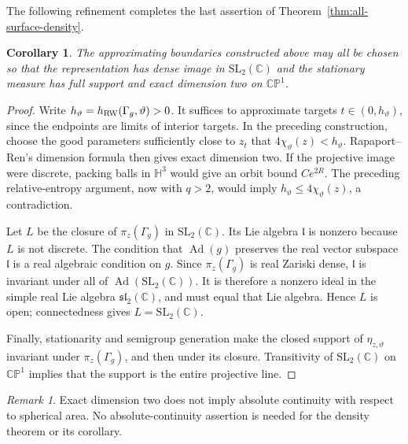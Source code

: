 \documentclass[11pt,letterpaper]{amsart}
\newtheorem{corollary}[theorem]{Corollary}
\theoremstyle{definition}
\theoremstyle{remark}
\newtheorem{remark}[theorem]{Remark}
\numberwithin{equation}{section}
\begin{document}
The following refinement completes the last assertion of
Theorem~\ref{thm:all-surface-density}.

\begin{corollary}\label{cor:dense-image-full-dimension}
The approximating boundaries constructed above
may all be chosen so that the representation has dense image in
$\mathrm{SL}_2(\mathbb C)$ and the stationary measure has full support
and exact dimension two on $\mathbb{CP}^1$.
\end{corollary}

\begin{proof}
Write $h_\vartheta=h_{\rm RW}(\Gamma_g,\vartheta)>0$.
It suffices to approximate targets $t\in(0,h_\vartheta)$, since the
endpoints are limits of interior targets. In the preceding construction,
choose the good parameters sufficiently close to $z_t$ that
$4\chi_\vartheta(z)<h_\vartheta$. Rapaport--Ren's dimension formula
then gives exact dimension two. If the projective image were discrete,
packing balls in $\mathbb H^3$ would give an orbit bound $Ce^{2R}$.
The preceding relative-entropy argument, now with $q>2$, would imply
$h_\vartheta\le4\chi_\vartheta(z)$, a contradiction.

Let $L$ be the closure of $\pi_z(\Gamma_g)$ in
$\mathrm{SL}_2(\mathbb C)$. Its Lie algebra $\mathfrak l$ is nonzero
because $L$ is not discrete. The condition that $\operatorname{Ad}(g)$
preserves the real vector subspace $\mathfrak l$ is a real algebraic
condition on $g$. Since $\pi_z(\Gamma_g)$ is real Zariski dense,
$\mathfrak l$ is invariant under all of
$\operatorname{Ad}(\mathrm{SL}_2(\mathbb C))$. It is therefore a
nonzero ideal in the simple real Lie algebra $\mathfrak{sl}_2(\mathbb C)$,
and must equal that Lie algebra. Hence $L$ is open; connectedness gives
$L=\mathrm{SL}_2(\mathbb C)$.

Finally, stationarity and semigroup generation make the closed support
of $\eta_{z,\vartheta}$ invariant under $\pi_z(\Gamma_g)$, and then
under its closure. Transitivity of $\mathrm{SL}_2(\mathbb C)$ on
$\mathbb{CP}^1$ implies that the support is the entire projective line.
\end{proof}

\begin{remark}
Exact dimension two does not imply absolute continuity with respect to
spherical area. No absolute-continuity assertion is needed for the
density theorem or its corollary.
\end{remark}
\end{document}

